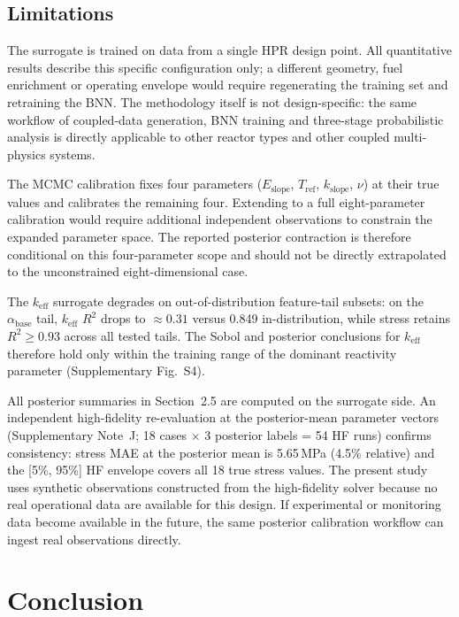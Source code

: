 \documentclass[11pt,a4paper]{article}
\newcommand{\keff}{\ensuremath{k_{\mathrm{eff}}}}
\newcommand{\Eslope}{\ensuremath{E_{\mathrm{slope}}}}
\newcommand{\abase}{\ensuremath{\alpha_{\mathrm{base}}}}
\newcommand{\Tref}{\ensuremath{T_{\mathrm{ref}}}}
\newcommand{\kslope}{\ensuremath{k_{\mathrm{slope}}}}
\begin{document}
\subsection{Limitations}

The surrogate is trained on data from a single HPR design point. All
quantitative results describe this specific configuration only; a
different geometry, fuel enrichment or operating envelope would require
regenerating the training set and retraining the BNN. The methodology
itself is not design-specific: the same workflow of coupled-data
generation, BNN training and three-stage probabilistic analysis is
directly applicable to other reactor types and other coupled
multi-physics systems.

The MCMC calibration fixes four parameters (\Eslope{}, \Tref{},
\kslope{}, $\nu$) at their true values and calibrates the remaining
four. Extending to a full eight-parameter calibration would require
additional independent observations to constrain the expanded parameter
space. The reported posterior contraction is therefore conditional on
this four-parameter scope and should not be directly extrapolated to the
unconstrained eight-dimensional case.

The \keff{} surrogate degrades on out-of-distribution feature-tail
subsets: on the \abase{} tail, \keff{} $R^2$ drops to ${\approx}0.31$
versus 0.849 in-distribution, while stress retains $R^2 \geq 0.93$
across all tested tails. The Sobol and posterior conclusions for \keff{}
therefore hold only within the training range of the dominant reactivity
parameter (Supplementary Fig.~S4).

All posterior summaries in Section~2.5 are computed on the surrogate
side. An independent high-fidelity re-evaluation at the posterior-mean
parameter vectors (Supplementary Note~J; 18 cases $\times$ 3 posterior
labels = 54 HF runs) confirms consistency: stress MAE at the posterior
mean is 5.65\,MPa (4.5\% relative) and the [5\%, 95\%] HF envelope
covers all 18 true stress values. The present study uses synthetic
observations constructed from the high-fidelity solver because no real
operational data are available for this design. If experimental or
monitoring data become available in the future, the same posterior
calibration workflow can ingest real observations directly.

\section{Conclusion}
\end{document}
